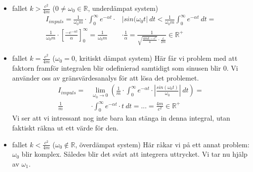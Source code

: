 \documentclass[10pt,a4paper]{article}
\begin{document}
\begin{itemize}
\item fallet $k>\frac{c^2}{4m}$ ($0\neq\omega_0 \in \mathbb{R}$, underdämpat system)
\begin{equation}
\begin{split}
I_{impuls}=\frac{1}{\omega_0  m} \cdot \int_{0}^{\infty}e^{-\alpha t}\cdot & | sin(\omega_0 t| \ dt <\frac{1}{\omega_0  m}\int_{0}^{\infty}e^{-\alpha t} \  dt =\\\frac{1}{\omega_0  m} \cdot \left[\frac{-e^{-\alpha t}}{\alpha}\right]_0^\infty= \frac{1}{\omega_0  m} & \cdot \frac{1}{\alpha}=\frac{1}{\sqrt{\frac{4 m k- c^2}{4}}\cdot\frac{c}{2m}}\in \mathbb{R}^+
\end{split}
\end{equation}
\item fallet $k=\frac{c^2}{4m}$ ($\omega_0=0$, kritiskt dämpat system)
\newline 
Här får vi problem med att faktorn framför integralen blir odefinierad samtidigt som sinusen blir 0. Vi använder oss av gränsvärdesanalys för att lösa det problemet.
\begin{equation}
\begin{split}
I_{impuls}= & \lim_{\omega_0\to0}\left(\frac{1}{m} \cdot \int_{0}^{\infty}e^{-\alpha t}\cdot |\frac{sin(\omega_0 t)}{\omega_0}| \ dt\right) = \\ \frac{1}{m} &\cdot\int_{0}^{\infty}e^{-\alpha t} \cdot t  \  dt=...=\frac{4m}{c^2}\in \mathbb{R}^+
\end{split}
\end{equation}
Vi ser att vi intressant nog inte bara kan stänga in denna integral, utan faktiskt räkna ut ett värde för den.
\item fallet $k<\frac{c^2}{4m}$ ($\omega_0 \notin \mathbb{R}$, överdämpat system)
\newline Här råkar vi på ett annat problem: $\omega_0$ blir komplex. Således blir det svårt att integrera uttrycket. Vi tar nu hjälp av $\omega_1$.


\end{itemize}
\end{document}
